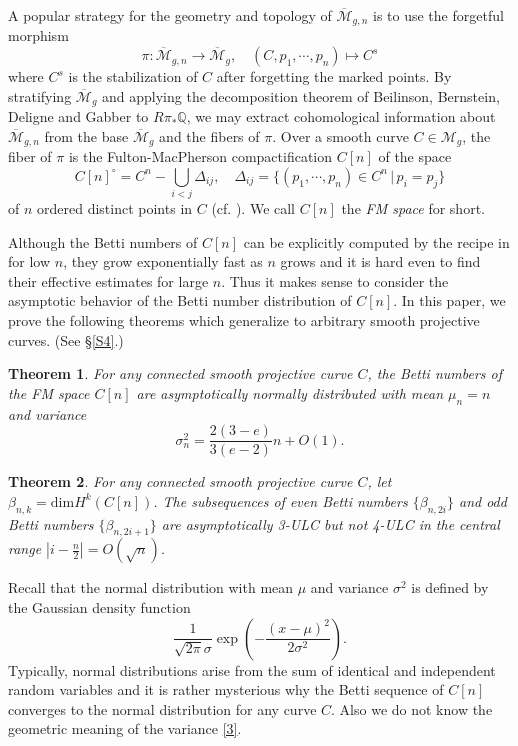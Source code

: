\documentclass[11pt,letterpaper]{amsart}
\numberwithin{equation}{section}
\newtheorem{theorem}{Theorem}[section]
\theoremstyle{definition}
\def\QQ{\mathbb{Q}}
\newcommand{\cal}{\mathcal}
\def\cM{{\cal M}}
\def\ocM{\overline{\cM}}
\def\mgn{\overline{\cM}_{g,n}}
\def\dim{\mathrm{dim} }
\def\lra{\longrightarrow }
\def\beq{\begin{equation}}
\def\eeq{\end{equation}}
\begin{document}
\medskip

A popular strategy for the geometry and topology of $\mgn$ is to use the forgetful morphism
$$\pi:\mgn\lra \ocM_g,\quad (C,p_1,\cdots,p_n)\mapsto {C}^s$$
where ${C}^s$ is the stabilization of $C$ after forgetting the marked points.
By stratifying $\ocM_g$ and applying the decomposition theorem of Beilinson, Bernstein, Deligne and Gabber to $R\pi_*\QQ$, we may extract cohomological information about $\mgn$ from the base $\ocM_g$ and the fibers of $\pi$.
Over a smooth curve $C\in \cM_g$, the fiber of $\pi$ is the Fulton-MacPherson compactification $C[n]$ of the space
\beq\label{1}
C[n]^\circ =C^n-\bigcup_{i<j} \Delta_{ij}, \quad \Delta_{ij}=\{(p_1,\cdots,p_n)\in C^n\,|\,p_i=p_j\}
\eeq
of $n$ ordered distinct points in $C$ (cf. \cite{FM}). We call $C[n]$ the \emph{FM space} for short.

Although the Betti numbers of $C[n]$ can be explicitly computed by the recipe in \cite{FM} for low $n$, they grow exponentially fast as $n$ grows and it is hard even to find  their effective estimates for large $n$.
Thus it makes sense to consider the asymptotic behavior of the Betti number distribution of $C[n]$.
In this paper, we prove the following theorems which generalize \cite[Theorem 4.1, Corollary 4.2]{CK} to arbitrary smooth projective curves. (See \S\ref{S4}.)

\begin{theorem}\label{2}
For any connected smooth projective curve $C$, the Betti numbers of the FM space $C[n]$ are asymptotically normally distributed with mean $\mu_n=n$ and variance
\beq\label{3} \sigma_n^2=\frac{2(3-e)}{3(e-2)}n+O(1).\eeq
\end{theorem}

\begin{theorem}\label{2_1}
 For any connected smooth projective curve $C$, let $\beta_{n,k}= \dim H^k(C[n])$.
 The subsequences of even Betti numbers $\{\beta_{n,2i}\}$ and odd Betti numbers $\{\beta_{n,2i+1}\}$ are asymptotically 3-ULC but not 4-ULC in the central range $|i - \frac{n}{2}|=O(\sqrt{n})$.
\end{theorem}

Recall that the normal distribution with mean $\mu$ and variance $\sigma^2$ is defined by the Gaussian density function
\beq\label{4} \frac{1}{\sqrt{2\pi}\sigma} \exp\left(-\frac{(x-\mu)^2}{2\sigma^2}\right).\eeq
Typically, normal distributions arise from the sum of identical and  independent random variables and it is rather mysterious why the Betti sequence of $C[n]$ converges to the normal distribution for any curve $C$. Also we do not know the geometric meaning of the variance \eqref{3}.
\end{document}
